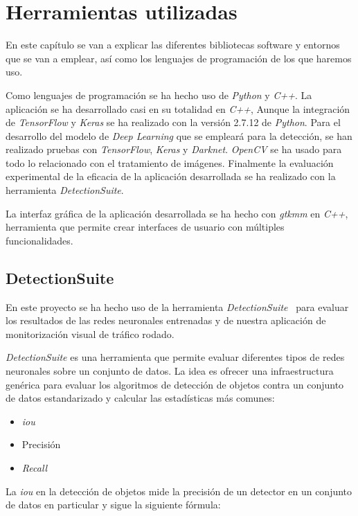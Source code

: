 \chapter{Herramientas utilizadas}\label{cap.herramientas}
En este capítulo se van a explicar las diferentes bibliotecas software y entornos que se van a emplear, así como los lenguajes de programación de los que haremos uso.

Como lenguajes de programación se ha hecho uso de \textit{Python} y \textit{C++}. La aplicación se ha desarrollado casi en su totalidad en \textit{C++}, Aunque la integración de \textit{TensorFlow} y \textit{Keras} se ha realizado con la versión 2.7.12 de \textit{Python}.
Para el desarrollo del modelo de \textit{Deep Learning} que se empleará para la detección, se han realizado pruebas con \textit{TensorFlow}, \textit{Keras} y \textit{Darknet}. \textit{OpenCV} se ha usado para todo lo relacionado con el tratamiento de imágenes. Finalmente la evaluación experimental de la eficacia de la aplicación desarrollada se ha realizado con la herramienta \textit{DetectionSuite}.

La interfaz gráfica de la aplicación desarrollada se ha hecho con \textit{gtkmm} en \textit{C++}, herramienta que permite crear interfaces de usuario con múltiples funcionalidades.



\section{DetectionSuite}
En este proyecto se ha hecho uso de la herramienta \textit{DetectionSuite}~\cite{detectionsuite} para evaluar los resultados de las redes neuronales entrenadas y de nuestra aplicación de monitorización visual de tráfico rodado.

\textit{DetectionSuite} es una herramienta que permite evaluar diferentes tipos de redes neuronales sobre un conjunto de datos. La idea es ofrecer una infraestructura genérica para evaluar los algoritmos de detección de objetos contra un conjunto de datos estandarizado y calcular las estadísticas más comunes:
\begin{itemize}
    \item \textit{\acrfull{iou}}
    \item Precisión
    \item \textit{Recall}
\end{itemize}

La \textit{\acrfull{iou}} en la detección de objetos mide la precisión de un detector en un conjunto de datos en particular y sigue la siguiente fórmula:

